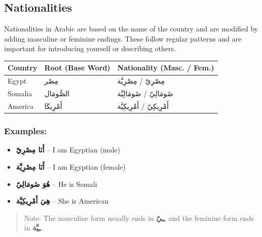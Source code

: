 \documentclass[
  a4paper,
  DIV=11,
  numbers=noendperiod]{scrartcl}
\providecommand{\tightlist}{%
  \setlength{\itemsep}{0pt}\setlength{\parskip}{0pt}}
\begin{document}
\subsection{Nationalities}\label{nationalities}

Nationalities in Arabic are based on the name of the country and are
modified by adding masculine or feminine endings. These follow regular
patterns and are important for introducing yourself or describing
others.

\begin{tcolorbox}[enhanced jigsaw, bottomrule=.15mm, arc=.35mm, colbacktitle=quarto-callout-tip-color!10!white, opacityback=0, toptitle=1mm, title=\textcolor{quarto-callout-tip-color}{\faLightbulb}\hspace{0.5em}{Country Roots \& Nationalities}, colframe=quarto-callout-tip-color-frame, opacitybacktitle=0.6, colback=white, coltitle=black, titlerule=0mm, left=2mm, toprule=.15mm, bottomtitle=1mm, rightrule=.15mm, leftrule=.75mm, breakable]

\begin{longtable}[]{@{}lll@{}}
\toprule\noalign{}
Country & Root (Base Word) & Nationality (Masc. / Fem.) \\
\midrule\noalign{}
\endhead
\bottomrule\noalign{}
\endlastfoot
Egypt & مِصْر & مِصْرِيّ / مِصْرِيَّة \\
Somalia & الصُّومَال & صُومَالِيّ / صُومَالِيَّة \\
America & أَمْرِيكَا & أَمْرِيكِيّ / أَمْرِيكِيَّة \\
\end{longtable}

\subsubsection{Examples:}\label{examples}

\begin{itemize}
\tightlist
\item
  \textbf{أَنَا مِصْرِيّ} -- I am Egyptian (male)\\
\item
  \textbf{أَنَا مِصْرِيَّة} -- I am Egyptian (female)\\
\item
  \textbf{هُوَ صُومَالِيّ} -- He is Somali\\
\item
  \textbf{هِيَ أَمْرِيكِيَّة} -- She is American
\end{itemize}

\begin{quote}
Note: The masculine form usually ends in \textbf{ـِيّ}, and the feminine
form ends in \textbf{ـِيَّة}.
\end{quote}

\end{tcolorbox}
\end{document}
